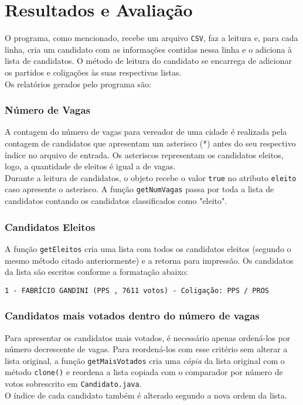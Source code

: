 \documentclass[12pt,a4paper]{article}
\begin{document}
\section{Resultados e Avaliação}
O programa, como mencionado, recebe um arquivo \texttt{CSV}, faz a leitura e, para cada linha, cria um candidato com as informações contidas nessa linha e o adiciona à lista de candidatos. O método de leitura do candidato se encarrega de adicionar os partidos e coligações às suas respectivas listas.\\
Os relatórios gerados pelo programa são:\\

\subsubsection*{Número de Vagas}
A contagem do número de vagas para vereador de uma cidade é realizada pela contagem de candidatos que apresentam um asterisco (*) antes do seu respectivo índice no arquivo de entrada. Os asteriscos representam os candidatos eleitos, logo, a quantidade de eleitos é igual a de vagas.\\
Durante a leitura de candidatos, o objeto recebe o valor \texttt{true} no atributo \texttt{eleito} caso apresente o asterisco. A função \texttt{getNumVagas} passa por toda a lista de candidatos contando os candidatos classificados como "eleito".

\subsubsection*{Candidatos Eleitos}
A função \texttt{getEleitos} cria uma lista com todos os candidatos eleitos (segundo o mesmo método citado anteriormente) e a retorna para impressão. Os candidatos da lista são escritos conforme a formatação abaixo:
\begin{center}
\texttt{1 - FABRÍCIO GANDINI (PPS , 7611 votos)	- Coligação:  PPS / PROS}\\
\end{center}

\subsubsection*{Candidatos mais votados dentro do número de vagas}
Para apresentar os candidatos mais votados, é necessário apenas ordená-los por número decrescente de vagas. Para reordená-los com esse critério sem alterar a lista original, a função \texttt{getMaisVotados} cria uma \textit{cópia} da lista original com o método \texttt{clone()} e reordena a lista copiada com o comparador por número de votos sobrescrito em \texttt{Candidato.java}.\\
O índice de cada candidato também é alterado segundo a nova ordem da lista.
\end{document}
